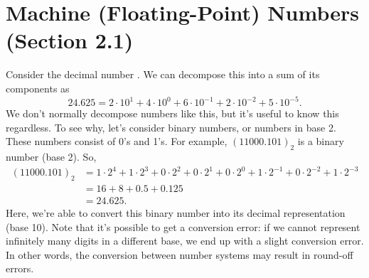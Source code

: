 \documentclass[letterpaper]{article}
\begin{document}
\section{Machine (Floating-Point) Numbers (Section 2.1)}
Consider the decimal number . We can decompose this into a sum of its components as 
\[24.625 = 2 \cdot 10^1 + 4 \cdot 10^0 + 6 \cdot 10^{-1} + 2 \cdot 10^{-2} + 5 \cdot 10^{-5}.\]
We don't normally decompose numbers like this, but it's useful to know this regardless. To see why, let's consider binary numbers, or numbers in base 2. These numbers consist of 0's and 1's. For example, $(11000.101)_2$ is a binary number (base 2). So,  
\[\begin{aligned}
    (11000.101)_2 &= 1 \cdot 2^4 + 1 \cdot 2^3 + 0 \cdot 2^2 + 0 \cdot 2^1 + 0 \cdot 2^0 + 1 \cdot 2^{-1} + 0 \cdot 2^{-2} + 1 \cdot 2^{-3} \\ 
        &= 16 + 8 + 0.5 + 0.125 \\ 
        &= 24.625.
\end{aligned}\]
Here, we're able to convert this binary number into its decimal representation (base 10). Note that it's possible to get a conversion error: if we cannot represent infinitely many digits in a different base, we end up with a slight conversion error. In other words, the conversion between number systems may result in round-off errors. 
\end{document}
